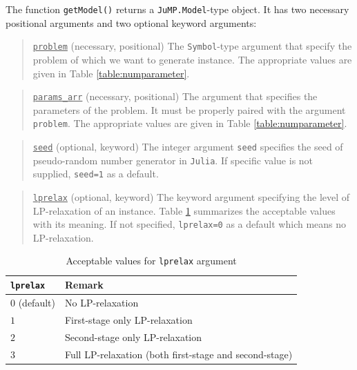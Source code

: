 \documentclass{hitec}
\newcommand{\julia}{\texttt{Julia}}
\newcommand{\jumpmodel}{\texttt{JuMP.Model}}
\begin{document}
	The function \texttt{getModel()} returns a \jumpmodel-type object. It has two necessary positional arguments and two optional keyword arguments:
	\begin{quote}
		\noindent\underline{\texttt{problem}} (necessary, positional) The \texttt{Symbol}-type argument that specify the problem of which we want to generate instance. The appropriate values are given in Table \ref{table:numparameter}. 
	\end{quote}
	
	\begin{quote}
		\noindent\underline{\texttt{params\_arr}} (necessary, positional) The argument that specifies the parameters of the problem. It must be properly paired with the argument \texttt{problem}. The appropriate values are given in Table \ref{table:numparameter}. 
	\end{quote}
	
	\begin{quote}
		\noindent\underline{\texttt{seed}} (optional, keyword) The integer argument \texttt{seed} specifies the seed of pseudo-random number generator in \julia. If specific value is not supplied, \texttt{seed=1} as a default.
	\end{quote}
	
	\begin{quote}
		\noindent\underline{\texttt{lprelax}} (optional, keyword) The keyword argument specifying the level of LP-relaxation of an instance. Table \ref{table:lprelax} summarizes the acceptable values with its meaning. If not specified, \texttt{lprelax=0} as a default which means no LP-relaxation.
	\end{quote}
	
	\begin{table}[H]
		\centering
		\caption{Acceptable values for \texttt{lprelax} argument}
		\label{table:lprelax}
		\begin{tabular}{@{}ll@{}}
			\toprule
			\texttt{lprelax} & Remark                                            \\ \midrule
			$0$ (default)              & No LP-relaxation                                  \\
			$1$              & First-stage only LP-relaxation                    \\
			$2$              & Second-stage only LP-relaxation                   \\
			$3$              & Full LP-relaxation (both first-stage and second-stage) \\ \bottomrule
		\end{tabular}%
	\end{table}
	
\end{document}

